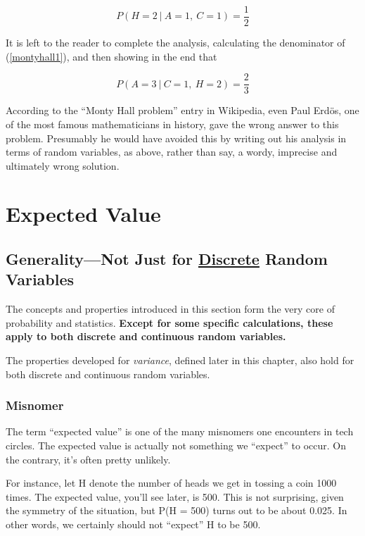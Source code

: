 \begin{equation}
P(H = 2 ~|~ A = 1, ~ C = 1) = \frac{1}{2}
\end{equation}

It is left to the reader to complete the analysis, calculating the
denominator of (\ref{montyhall1}), and then showing in the end that

\begin{equation}
P(A = 3 ~|~ C = 1, ~ H = 2) = \frac{2}{3}
\end{equation}

According to the ``Monty Hall problem'' entry in Wikipedia, even Paul
Erd{\"o}s, one of the most famous mathematicians in history, gave the wrong
answer to this problem.  Presumably he would have avoided this by
writing out his analysis in terms of random variables, as above, rather
than say, a wordy, imprecise and ultimately wrong solution.

\section{Expected Value}
\label{expval}

\subsection{Generality---Not Just for \underline{Discrete} Random
Variables}

The concepts and properties introduced in this section form the very
core of probability and statistics.  {\bf Except for some specific
calculations, these apply to both discrete and continuous random
variables.}

The properties developed for {\it variance}, defined later in this
chapter, also hold for both discrete and continuous random variables.

\subsubsection{Misnomer}
\label{whatisit}

The term ``expected value'' is one of the many misnomers one encounters
in tech circles.  The expected value is actually not something we
``expect'' to occur.  On the contrary, it's often pretty unlikely.

For instance, let H denote the number of heads we get in tossing a coin
1000 times.  The expected value, you'll see later, is 500.  This is not
surprising, given the symmetry of the situation, but P(H = 500) turns
out to be about 0.025.  In other words, we certainly should not
``expect'' H to be 500.

